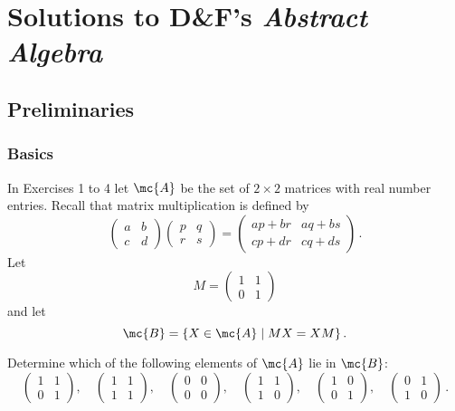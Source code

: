 \chapter{Solutions to D\&F's \emph{Abstract Algebra}}

\section*{Preliminaries}

\subsection{Basics}

In Exercises 1 to 4 let $\mc{A}$ be the set of $2 \times 2$ matrices with real number entries. Recall that matrix multiplication is defined by
\[
	\begin{pmatrix}
		a & b \\
		c & d
	\end{pmatrix}
	\begin{pmatrix}
		p & q \\
		r & s
	\end{pmatrix}
	=
	\begin{pmatrix}
		ap + br & aq + bs \\
		cp + dr & cq + ds
	\end{pmatrix}\,.
\]
Let
\[
	M = 
	\begin{pmatrix}
		1 & 1 \\
		0 & 1
	\end{pmatrix}
\]
and let
\[
	\mc{B} = \{ X \in \mc{A} \mid MX = XM \}\,.
\]

\begin{exercise}
	Determine which of the following elements of $\mc{A}$ lie in $\mc{B}$:
	\[
		\begin{pmatrix}
			1 & 1 \\
			0 & 1
		\end{pmatrix},
		\quad
		\begin{pmatrix}
			1 & 1 \\
			1 & 1
		\end{pmatrix},
		\quad
		\begin{pmatrix}
			0 & 0 \\
			0 & 0
		\end{pmatrix},
		\quad
		\begin{pmatrix}
			1 & 1 \\
			1 & 0
		\end{pmatrix},
		\quad
		\begin{pmatrix}
			1 & 0 \\
			0 & 1
		\end{pmatrix},
		\quad
		\begin{pmatrix}
			0 & 1 \\
			1 & 0
		\end{pmatrix}\,.
	\]
\end{exercise}

